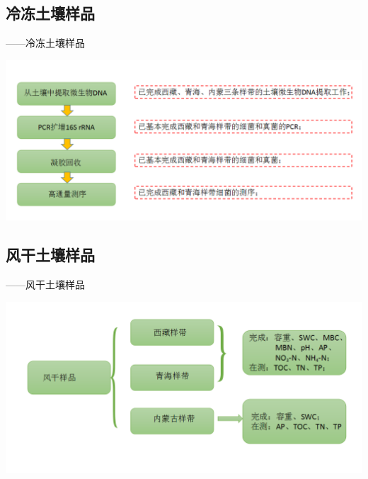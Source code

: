 \subsection{冷冻土壤样品}
\begin{frame}{\insertsection——冷冻土壤样品}
	\begin{center}
		\includegraphics[width = \textwidth]{./pic/3.3.png}
	\end{center}
\end{frame}
\subsection{风干土壤样品}
\begin{frame}{\insertsection——风干土壤样品}
		\begin{center}
			\includegraphics[width = \textwidth]{./pic/3.4.png}
		\end{center}
\end{frame}
